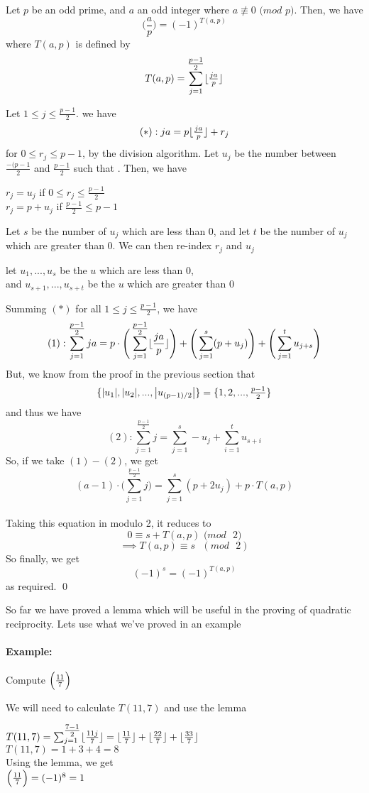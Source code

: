 \documentclass[../main.tex]{subfiles}
\begin{document}
\begin{lem}
    Let $p$ be an odd prime, and $a$ an odd integer where $a \not\equiv 0$ $(mod$ $p)$. Then, we have
    $$\bigg(\frac{a}{p}\bigg)=(-1)^{T(a,p)}$$ where $T(a,p)$ is defined by $$T(a,p)= \sum_{j=1}^{\tfrac{p-1}{2}}\lfloor\tfrac{ja}{p}\rfloor$$
\end{lem}
\begin{pf}[Of Lemma]
    Let $1 \leq j \leq \tfrac{p-1}{2}$. we have
    $$(*): ja=p\lfloor\tfrac{ja}{p}\rfloor+r_j$$ for $0 \leq r_j \leq p-1$, by the division algorithm. Let $u_j$ be the number between $\tfrac{-(p-1}{2}$ and $\tfrac{p-1}{2}$ such that . Then, we have
    \begin{center}
        $r_j=u_j$ if $0 \leq r_j \leq \tfrac{p-1}{2}$ \\
        $r_j=p+u_j$ if $\tfrac{p-1}{2} \leq p-1$
    \end{center}
    Let $s$ be the number of $u_j$ which are less than 0, and let $t$ be the number of $u_j$ which are greater than 0. We can then re-index $r_j$ and $u_j$ 
    \begin{center}
        let $u_1,...,u_s$ be the $u$ which are less than 0, \\
        and $u_{s+1},...,u_{s+t}$ be the $u$ which are greater than 0
    \end{center}
    Summing $(*)$ for all $1 \leq j \leq \tfrac{p-1}{2}$, we have
    $$(1): \sum_{j=1}^{\tfrac{p-1}{2}}ja=p\cdot \Bigg(\sum_{j=1}^{\tfrac{p-1}{2}}\lfloor\dfrac{ja}{p}\rfloor\Bigg) + \Bigg(\sum_{j=1}^{s}(p+u_j)\Bigg)+\Bigg(\sum_{j=1}^{t}u_{j+s}\Bigg)$$
    But, we know from the proof in the previous section that $$\{\abs{u_1},\abs{u_2},...,\abs{u_{(p-1)/2}}\}=\{1,2,...,\tfrac{p-1}{2}\}$$ and thus we have
    $$(2): \sum_{j=1}^{\tfrac{p-1}{2}}j=\sum_{j=1}^{s}-u_j+\sum_{i=1}^{t}u_{s+i}$$
    So, if we take $(1)-(2)$, we get
    $$(a-1)\cdot \Bigg(\sum_{j=1}^{\tfrac{p-1}{2}}j\Bigg)=\sum_{j=1}^{s}(p+2u_j)+p\cdot T(a,p)$$ \\
    Taking this equation in modulo 2, it reduces to
    $$0 \equiv s+T(a,p)\text{ (}mod\text{ }2)$$
    $$\implies T(a,p) \equiv s\text{ }(mod\text{ }2)$$ So finally, we get $$(-1)^s=(-1)^{T(a,p)}$$ as required. \qed
\end{pf}
\newpage

So far we have proved a lemma which will be useful in the proving of quadratic reciprocity. Lets use what we've proved in an example
\paragraph{Example:} Compute $\Big(\frac{11}{7}\Big)$
\begin{ans}
    We will need to calculate $T(11,7)$ and use the lemma
    \begin{center}
        $T(11,7)=\sum_{j=1}^{\tfrac{7-1}{2}}\lfloor\tfrac{11j}{7}\rfloor=\lfloor\tfrac{11}{7}\rfloor+\lfloor\tfrac{22}{7}\rfloor+\lfloor\tfrac{33}{7}\rfloor$ \\
        $T(11,7)=1+3+4=8$ \\
        Using the lemma, we get \\
        $\Big(\frac{11}{7}\Big)=(-1)^8=1$
    \end{center}
\end{ans}
\end{document}
